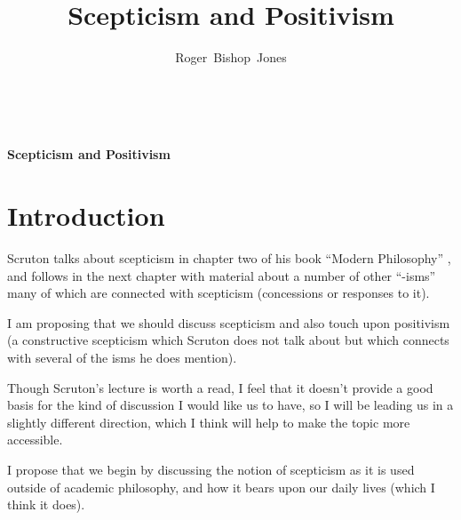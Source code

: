 \documentclass[14pt,titlepage]{extarticle}
\title{Scepticism and Positivism}
\author{Roger~Bishop~Jones}
\date{\ }
\begin{document}

                               
\begin{titlepage}
\maketitle





\end{titlepage}

\begin{centering}
{\LARGE \bf Scepticism and Positivism}
\end{centering}

\setcounter{tocdepth}{1}
{\parskip-0pt\tableofcontents}




\section{Introduction}

Scruton talks about scepticism in chapter two of his book ``Modern Philosophy'' \cite{scruton}, and follows in the next chapter with material about a number of other ``-isms'' many of which are connected with scepticism (concessions or responses to it).

I am proposing that we should discuss scepticism and also touch upon positivism (a constructive scepticism which Scruton does not talk about but which connects with several of the isms he does mention).

Though Scruton's lecture is worth a read, I feel that it doesn't provide a good basis for the kind of discussion I would like us to have, so I will be leading us in a slightly different direction, which I think will help to make the topic more accessible.

I propose that we begin by discussing the notion of scepticism as it is used outside of academic philosophy, and how it bears upon our daily lives (which I think it does).
\end{document}
